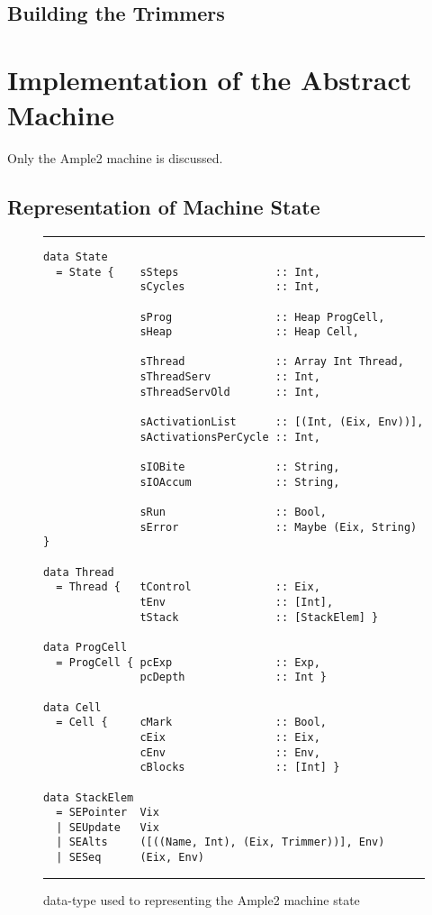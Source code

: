 \subsection{Building the Trimmers}




\section{Implementation of the Abstract Machine}
Only the Ample2 machine is discussed.


\subsection{Representation of Machine State}


\begin{figure}
\hrule
\smallskip
\begin{verbatim}
data State
  = State {    sSteps               :: Int,
               sCycles              :: Int,

               sProg                :: Heap ProgCell,
               sHeap                :: Heap Cell,

               sThread              :: Array Int Thread,
               sThreadServ          :: Int,
               sThreadServOld       :: Int,
  
               sActivationList      :: [(Int, (Eix, Env))],
               sActivationsPerCycle :: Int,
        
               sIOBite              :: String,
               sIOAccum             :: String,

               sRun                 :: Bool,
               sError               :: Maybe (Eix, String) }

data Thread 
  = Thread {   tControl             :: Eix,  
               tEnv                 :: [Int], 
               tStack               :: [StackElem] }

data ProgCell
  = ProgCell { pcExp                :: Exp,  
               pcDepth              :: Int }

data Cell
  = Cell {     cMark                :: Bool,
               cEix                 :: Eix,
               cEnv                 :: Env,
               cBlocks              :: [Int] }

data StackElem
  = SEPointer  Vix
  | SEUpdate   Vix
  | SEAlts     ([((Name, Int), (Eix, Trimmer))], Env)
  | SESeq      (Eix, Env)
\end{verbatim}
\hrule
\caption{data-type used to representing the Ample2 machine state}
\label{figAmple2State}
\end{figure}







